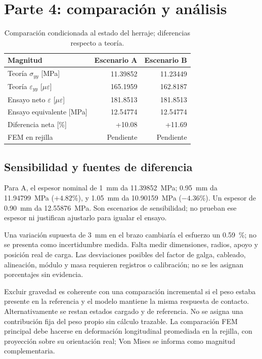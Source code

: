 \documentclass[11pt,a4paper]{article}
\begin{document}
\section{Parte 4: comparación y análisis}
\begin{table}[H]\centering\small
\caption{Comparación condicionada al estado del herraje; diferencias respecto a teoría.}
\begin{tabular}{@{}lrr@{}}\toprule
Magnitud & Escenario A & Escenario B \\\midrule
Teoría $\sigma_{yy}$ [MPa] & 11.39852 & 11.23449 \\
Teoría $\varepsilon_{yy}$ [$\mu\varepsilon$] & 165.1959 & 162.8187 \\
Ensayo neto $\varepsilon$ [$\mu\varepsilon$] & 181.8513 & 181.8513 \\
Ensayo equivalente [MPa] & 12.54774 & 12.54774 \\
Diferencia neta [\%] & +10.08 & +11.69 \\
FEM en rejilla & Pendiente & Pendiente \\
\bottomrule\end{tabular}\end{table}

\subsection{Sensibilidad y fuentes de diferencia}
Para A, el espesor nominal de \SI{1}{mm} da \SI{11.39852}{MPa}; \SI{0.95}{mm} da \SI{11.94799}{MPa} ($+4.82\%$), y \SI{1.05}{mm} da \SI{10.90159}{MPa} ($-4.36\%$). Un espesor de \SI{0.90}{mm} da \SI{12.55876}{MPa}. Son escenarios de sensibilidad; no prueban ese espesor ni justifican ajustarlo para igualar el ensayo.

Una variación supuesta de \SI{3}{mm} en el brazo cambiaría el esfuerzo un \SI{0.59}{\percent}; no se presenta como incertidumbre medida. Falta medir dimensiones, radios, apoyo y posición real de carga. Las desviaciones posibles del factor de galga, cableado, alineación, módulo y masa requieren registros o calibración; no se les asignan porcentajes sin evidencia.

Excluir gravedad es coherente con una comparación incremental si el peso estaba presente en la referencia y el modelo mantiene la misma respuesta de contacto. Alternativamente se restan estados cargado y de referencia. No se asigna una contribución fija del peso propio sin cálculo trazable. La comparación FEM principal debe hacerse en deformación longitudinal promediada en la rejilla, con proyección sobre su orientación real; Von Mises se informa como magnitud complementaria.
\end{document}
